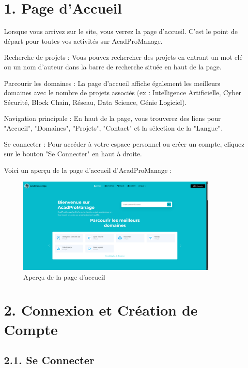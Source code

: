 \documentclass[a4paper,12pt]{article}
\begin{document}
\section*{1. Page d'Accueil}
Lorsque vous arrivez sur le site, vous verrez la page d'accueil. C'est le point de départ pour toutes vos activités sur AcadProManage.

Recherche de projets : Vous pouvez rechercher des projets en entrant un mot-clé ou un nom d'auteur dans la barre de recherche située en haut de la page.

Parcourir les domaines : La page d'accueil affiche également les meilleurs domaines avec le nombre de projets associés (ex : Intelligence Artificielle, Cyber Sécurité, Block Chain, Réseau, Data Science, Génie Logiciel).

Navigation principale : En haut de la page, vous trouverez des liens pour "Accueil", "Domaines", "Projets", "Contact" et la sélection de la "Langue".

Se connecter : Pour accéder à votre espace personnel ou créer un compte, cliquez sur le bouton "Se Connecter" en haut à droite.

Voici un aperçu de la page d'accueil d'AcadProManage :

\begin{figure}[H] 
\centering
\includegraphics[width=0.9\textwidth]{IMAGES/Accueil.png}
\caption{Aperçu de la page d’accueil}
\label{fig:Accueil}
\end{figure}


\section*{2. Connexion et Création de Compte}
\subsection*{2.1. Se Connecter}
\end{document}
